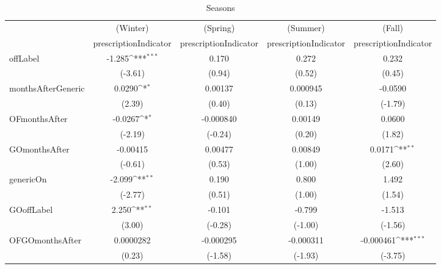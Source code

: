 \begin{table}[htbp]\centering
\def\sym#1{\ifmmode^{#1}\else\(^{#1}\)\fi}
\caption{Seasons\label{tab1}}
\begin{tabular}{l*{4}{c}}
\hline\hline
            &\multicolumn{1}{c}{(Winter)}&\multicolumn{1}{c}{(Spring)}&\multicolumn{1}{c}{(Summer)}&\multicolumn{1}{c}{(Fall)}\\
            &\multicolumn{1}{c}{prescriptionIndicator}&\multicolumn{1}{c}{prescriptionIndicator}&\multicolumn{1}{c}{prescriptionIndicator}&\multicolumn{1}{c}{prescriptionIndicator}\\
\hline
offLabel    &      -1.285\sym{***}&       0.170         &       0.272         &       0.232         \\
            &     (-3.61)         &      (0.94)         &      (0.52)         &      (0.45)         \\
[1em]
monthsAfterGeneric&      0.0290\sym{*}  &     0.00137         &    0.000945         &     -0.0590         \\
            &      (2.39)         &      (0.40)         &      (0.13)         &     (-1.79)         \\
[1em]
OFmonthsAfter&     -0.0267\sym{*}  &   -0.000840         &     0.00149         &      0.0600         \\
            &     (-2.19)         &     (-0.24)         &      (0.20)         &      (1.82)         \\
[1em]
GOmonthsAfter&    -0.00415         &     0.00477         &     0.00849         &      0.0171\sym{**} \\
            &     (-0.61)         &      (0.53)         &      (1.00)         &      (2.60)         \\
[1em]
genericOn   &      -2.099\sym{**} &       0.190         &       0.800         &       1.492         \\
            &     (-2.77)         &      (0.51)         &      (1.00)         &      (1.54)         \\
[1em]
GOoffLabel  &       2.250\sym{**} &      -0.101         &      -0.799         &      -1.513         \\
            &      (3.00)         &     (-0.28)         &     (-1.00)         &     (-1.56)         \\
[1em]
OFGOmonthsAfter&   0.0000282         &   -0.000295         &   -0.000311         &   -0.000461\sym{***}\\
            &      (0.23)         &     (-1.58)         &     (-1.93)         &     (-3.75)         \\

\end{tabular}
\end{table}
